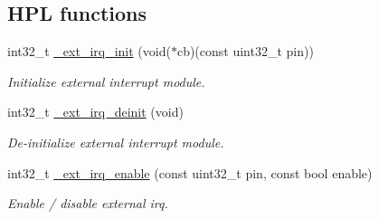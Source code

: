 \subsection*{H\+PL functions}
\begin{DoxyCompactItemize}
\item 
int32\+\_\+t \hyperlink{group___h_p_l_gad7c12a758c9839e074d1d97d255e09ab}{\+\_\+ext\+\_\+irq\+\_\+init} (void($\ast$cb)(const uint32\+\_\+t pin))
\begin{DoxyCompactList}\small\item\em Initialize external interrupt module. \end{DoxyCompactList}\item 
int32\+\_\+t \hyperlink{group___h_p_l_gad29f685cb658b260303c55fb7a88cdb0}{\+\_\+ext\+\_\+irq\+\_\+deinit} (void)
\begin{DoxyCompactList}\small\item\em De-\/initialize external interrupt module. \end{DoxyCompactList}\item 
int32\+\_\+t \hyperlink{group___h_p_l_gac2fa4b43da6356425b0188b744b6f4cc}{\+\_\+ext\+\_\+irq\+\_\+enable} (const uint32\+\_\+t pin, const bool enable)
\begin{DoxyCompactList}\small\item\em Enable / disable external irq. \end{DoxyCompactList}\end{DoxyCompactItemize}
